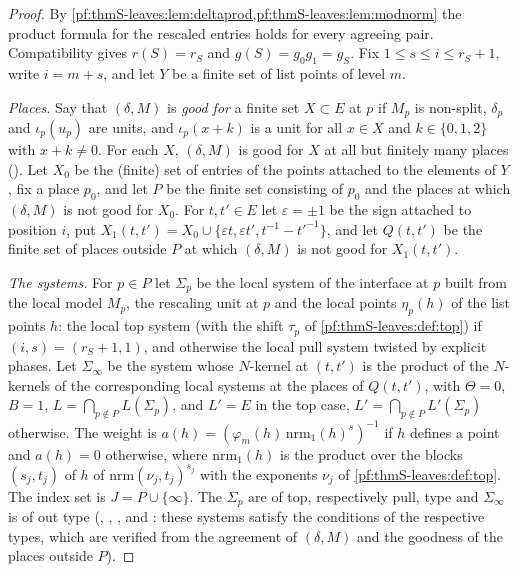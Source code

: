 \begin{proof}
By \cref{pf:thmS-leaves:lem:deltaprod,pf:thmS-leaves:lem:modnorm} the product formula for the rescaled entries holds for every
agreeing pair. Compatibility gives $r(S)=r_S$ and $g(S)=g_0g_1=g_S$. Fix $1\le s\le i\le r_S+1$, write $i=m+s$, and let $Y$ be a
finite set of list points of level $m$.

\emph{Places.} Say that $(\delta,M)$ is \emph{good for} a finite set $X\subset E$ at $p$ if $M_p$ is non-split, $\delta_p$ and $\iota_p(u_p)$
are units, and $\iota_p(x+k)$ is a unit for all $x\in X$ and $k\in\{0,1,2\}$ with $x+k\ne0$. For each $X$, $(\delta,M)$ is good for $X$
at all but finitely many places (). Let $X_0$ be the (finite) set of entries
of the points attached to the elements of $Y$, fix a place $p_0$, and let $P$ be the finite set consisting of $p_0$ and the places
at which $(\delta,M)$ is not good for $X_0$. For $t,t'\in E$ let $\varepsilon=\pm1$ be the sign attached to position $i$, put
$X_1(t,t')=X_0\cup\{\varepsilon t,\varepsilon t',t^{-1}-t'^{-1}\}$, and let $Q(t,t')$ be the finite set of places outside $P$ at which
$(\delta,M)$ is not good for $X_1(t,t')$.

\emph{The systems.} For $p\in P$ let $\Sigma_p$ be the local system of the interface at $p$ built from the local model $M_p$, the
rescaling unit at $p$ and the local points $\eta_p(h)$ of the list points $h$: the local top system (with the shift $\tau_p$ of
\cref{pf:thmS-leaves:def:top}) if $(i,s)=(r_S+1,1)$, and otherwise the local pull system twisted by explicit phases. Let
$\Sigma_\infty$ be the system whose $N$-kernel at $(t,t')$ is the product of the $N$-kernels of the corresponding local systems at the
places of $Q(t,t')$, with $\Theta=0$, $B=1$, $L=\bigcap_{p\notin P}L(\Sigma_p)$, and $L'=E$ in the top case,
$L'=\bigcap_{p\notin P}L'(\Sigma_p)$ otherwise. The weight is $a(h)=(\varphi_m(h)\,\mathrm{nrm}_1(h)^s)^{-1}$ if $h$ defines a point and
$a(h)=0$ otherwise, where $\mathrm{nrm}_1(h)$ is the product over the blocks $(s_j,t_j)$ of $h$ of $\mathrm{nrm}(\nu_j,t_j)^{s_j}$ with the
exponents $\nu_j$ of \cref{pf:thmS-leaves:def:top}. The index set is $J=P\cup\{\infty\}$. The $\Sigma_p$ are of top, respectively
pull, type and $\Sigma_\infty$ is of out type
(, , , and :
these systems satisfy the conditions of the respective types, which are verified from the agreement of $(\delta,M)$ and the
goodness of the places outside $P$).


\end{proof}
